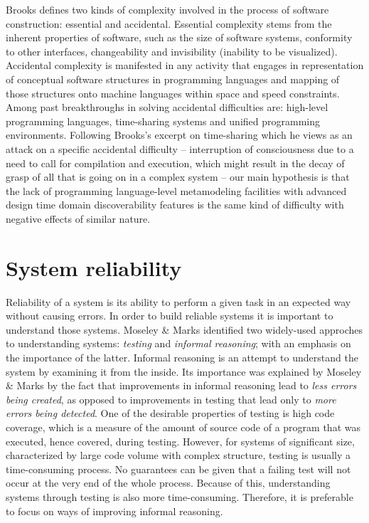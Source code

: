 \n

Brooks \cite{brooks} defines two kinds of complexity involved in the process of software construction: essential and accidental.
Essential complexity stems from the inherent properties of software, such as the size of software systems, conformity to other interfaces, changeability and invisibility (inability to be visualized).
Accidental complexity is manifested in any activity that engages in representation of conceptual software structures in programming languages and mapping of those structures onto machine languages within space and speed constraints.
Among past breakthroughs in solving accidental difficulties are: high-level programming languages, time-sharing systems and unified programming environments.
Following Brooks’s excerpt on time-sharing which he views as an attack on a specific accidental difficulty -- interruption of consciousness due to a need to call for compilation and execution, which might result in the decay of grasp of all that is going on in a complex system -- our main hypothesis is that the lack of programming language-level metamodeling facilities with advanced design time domain discoverability features is the same kind of difficulty with negative effects of similar nature.

\section{System reliability}
Reliability of a system is its ability to perform a given task in an expected way without causing errors.
In order to build reliable systems it is important to understand those systems.
Moseley \& Marks \cite{moseley} identified two widely-used approches to understanding systems: \textit{testing} and \textit{informal reasoning}; with an emphasis on the importance of the latter.
Informal reasoning is an attempt to understand the system by examining it from the inside.
Its importance was explained by Moseley \& Marks by the fact that improvements in informal reasoning lead to \textit{less errors being created}, as opposed to improvements in testing that lead only to \textit{more errors being detected}.
One of the desirable properties of testing is high code coverage, which is a measure of the amount of source code of a program that was executed, hence covered, during testing.
However, for systems of significant size, characterized by large code volume with complex structure, testing is usually a time-consuming process.
No guarantees can be given that a failing test will not occur at the very end of the whole process.
Because of this, understanding systems through testing is also more time-consuming.
Therefore, it is preferable to focus on ways of improving informal reasoning.

